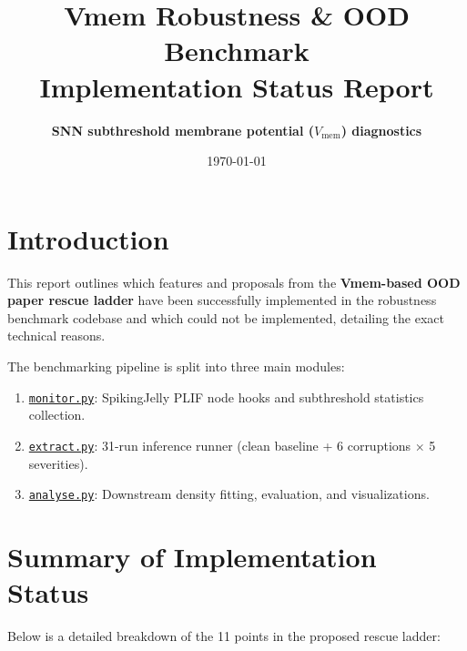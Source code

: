 \documentclass[11pt,a4paper]{article}
\title{\textbf{Vmem Robustness \& OOD Benchmark \\ Implementation Status Report}}
\author{\textbf{SNN subthreshold membrane potential ($V_{\text{mem}}$) diagnostics}}
\date{\today}
\begin{document}
\maketitle

\section{Introduction}
This report outlines which features and proposals from the \textbf{Vmem-based OOD paper rescue ladder} have been successfully implemented in the robustness benchmark codebase and which could not be implemented, detailing the exact technical reasons.

The benchmarking pipeline is split into three main modules:
\begin{enumerate}
    \item \href{run:monitor.py}{\texttt{monitor.py}}: SpikingJelly PLIF node hooks and subthreshold statistics collection.
    \item \href{run:extract.py}{\texttt{extract.py}}: 31-run inference runner (clean baseline + 6 corruptions $\times$ 5 severities).
    \item \href{run:analyse.py}{\texttt{analyse.py}}: Downstream density fitting, evaluation, and visualizations.
\end{enumerate}

\section{Summary of Implementation Status}
Below is a detailed breakdown of the 11 points in the proposed rescue ladder:
\end{document}
